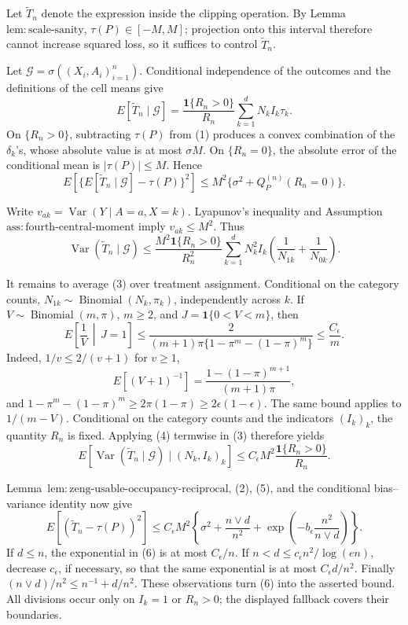 Let \(\widetilde T_n\) denote the expression inside the clipping operation.  By Lemma~\(\mathrm{lem:scale\text{-}sanity}\), \(\tau(P)\in[-M,M]\); projection onto this interval therefore cannot increase squared loss, so it suffices to control \(\widetilde T_n\).

Let \(\mathcal G=\sigma((X_i,A_i)_{i=1}^n)\).  Conditional independence of the outcomes and the definitions of the cell means give
\[
 E[\widetilde T_n\mid\mathcal G]
 =\frac{\mathbf 1\{R_n>0\}}{R_n}\sum_{k=1}^dN_kI_k\tau_k.
\tag{1}
\]
On \(\{R_n>0\}\), subtracting \(\tau(P)\) from (1) produces a convex combination of the \(\delta_k\)'s, whose absolute value is at most \(\sigma M\).  On \(\{R_n=0\}\), the absolute error of the conditional mean is \(|\tau(P)|\le M\).  Hence
\[
 E\!\left[\{E[\widetilde T_n\mid\mathcal G]-\tau(P)\}^2\right]
 \le M^2\{\sigma^2+Q_P^{(n)}(R_n=0)\}.
\tag{2}
\]

Write \(v_{ak}=\operatorname{Var}(Y\mid A=a,X=k)\).  Lyapunov's inequality and Assumption~\(\mathrm{ass:fourth\text{-}central\text{-}moment}\) imply \(v_{ak}\le M^2\).  Thus
\[
 \operatorname{Var}(\widetilde T_n\mid\mathcal G)
 \le \frac{M^2\mathbf 1\{R_n>0\}}{R_n^2}
 \sum_{k=1}^dN_k^2I_k\left(\frac1{N_{1k}}+\frac1{N_{0k}}\right).
\tag{3}
\]

It remains to average (3) over treatment assignment.  Conditional on the category counts, \(N_{1k}\sim\operatorname{Binomial}(N_k,\pi_k)\), independently across \(k\).  If \(V\sim\operatorname{Binomial}(m,\pi)\), \(m\ge2\), and \(J=\mathbf 1\{0<V<m\}\), then
\[
 E\left[\frac1V\,\middle|\,J=1\right]
 \le \frac{2}{(m+1)\pi\{1-\pi^m-(1-\pi)^m\}}
 \le \frac{C_{\epsilon}}m.
\tag{4}
\]
Indeed, \(1/v\le2/(v+1)\) for \(v\ge1\),
\[
 E[(V+1)^{-1}]=\frac{1-(1-\pi)^{m+1}}{(m+1)\pi},
\]
and \(1-\pi^m-(1-\pi)^m\ge2\pi(1-\pi)\ge2\epsilon(1-\epsilon)\).  The same bound applies to \(1/(m-V)\).  Conditional on the category counts and the indicators \((I_k)_k\), the quantity \(R_n\) is fixed.  Applying (4) termwise in (3) therefore yields
\[
 E[\operatorname{Var}(\widetilde T_n\mid\mathcal G)\mid (N_k,I_k)_k]
 \le C_{\epsilon}M^2\frac{\mathbf 1\{R_n>0\}}{R_n}.
\tag{5}
\]

Lemma~\(\mathrm{lem:zeng\text{-}usable\text{-}occupancy\text{-}reciprocal}\), (2), (5), and the conditional bias--variance identity now give
\[
 E[(\widetilde T_n-\tau(P))^2]
 \le C_{\epsilon}M^2\left\{\sigma^2+\frac{n\vee d}{n^2}
 +\exp\left(-b_{\epsilon}\frac{n^2}{n\vee d}\right)\right\}.
\tag{6}
\]
If \(d\le n\), the exponential in (6) is at most \(C_{\epsilon}/n\).  If \(n<d\le c_{\epsilon}n^2/\log(en)\), decrease \(c_{\epsilon}\), if necessary, so that the same exponential is at most \(C_{\epsilon}d/n^2\).  Finally \((n\vee d)/n^2\le n^{-1}+d/n^2\).  These observations turn (6) into the asserted bound.  All divisions occur only on \(I_k=1\) or \(R_n>0\); the displayed fallback covers their boundaries.